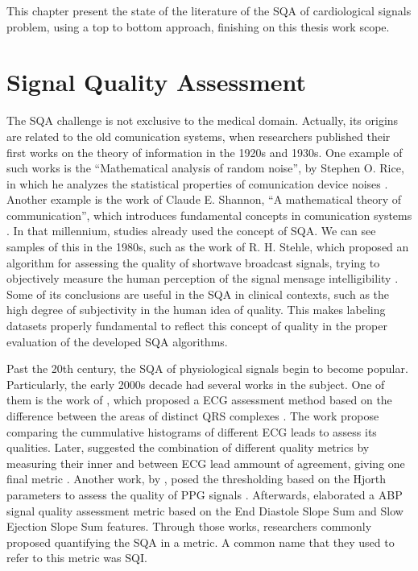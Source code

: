

This chapter present the state of the literature of the \acrlong{SQA} of cardiological signals problem, using a top to bottom approach, finishing on this thesis work scope.

\section{Signal Quality Assessment}

The \acrfull{SQA} challenge is not exclusive to the medical domain. Actually, its origins are related to the old comunication systems, when researchers published their first works on the theory of information in the 1920s and 1930s. One example of such works is the ``Mathematical analysis of random noise'', by Stephen O. Rice, in which he analyzes the statistical properties of comunication device noises \cite{origins-1}. Another example is the work of Claude E. Shannon, ``A mathematical theory of communication'', which introduces fundamental concepts in comunication systems \cite{origins-2}. In that millennium, studies already used the concept of \acrshort{SQA}. We can see samples of this in the 1980s, such as the work of R. H. Stehle, which proposed an algorithm for assessing the quality of shortwave broadcast signals, trying to objectively measure the human perception of the signal mensage intelligibility \cite{origins-3}. Some of its conclusions are useful in the \acrshort{SQA} in clinical contexts, such as the high degree of subjectivity in the human idea of quality. This makes labeling datasets properly fundamental to reflect this concept of quality in the proper evaluation of the developed \acrshort{SQA} algorithms.
	
Past the 20th century, the \acrshort{SQA} of physiological signals begin to become popular. Particularly, the early 2000s decade had several works in the subject. One of them is the work of \citeauthor{2000s-1}, which proposed a \acrshort{ECG} assessment method based on the difference between the areas of distinct QRS complexes \cite{2000s-1}. The work propose comparing the cummulative histograms of different \acrshort{ECG} leads to assess its qualities. Later, \citeauthor{2000s-2} suggested the combination of different quality metrics by measuring their inner and between \acrshort{ECG} lead ammount of agreement, giving one final metric \cite{2000s-2}. Another work, by \citeauthor{2000s-3}, posed the thresholding based on the Hjorth parameters to assess the quality of \acrshort{PPG} signals \cite{2000s-3}. Afterwards, \citeauthor{2000s-4} elaborated a \acrshort{ABP} signal quality assessment metric based on the End Diastole Slope Sum and Slow Ejection Slope Sum features. Through those works, researchers commonly proposed quantifying the \acrshort{SQA} in a metric. A common name that they used to refer to this metric was \acrfull{SQI}. 


